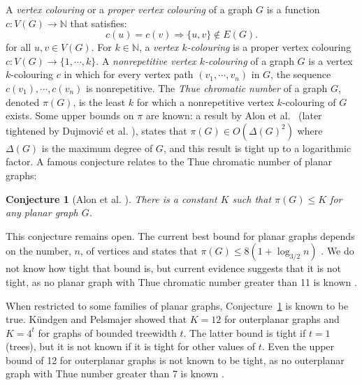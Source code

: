 \documentclass{patmorin}
\newcommand{\naturals}{\mathbb{N}}
\newtheorem{conjecture}[theorem]{Conjecture}
\begin{document}
A \emph{vertex colouring} or a \emph{proper vertex colouring} of a graph $G$ is a function $c: V(G) \rightarrow \naturals$ that satisfies:
\begin{equation}
c(u) = c(v) \Rightarrow \{u,v\} \notin E(G).
\label{eqn:propervcolouring}
\end{equation}
for all $u,v \in V(G)$. For $k \in \naturals$, a \emph{vertex $k$-colouring} is a proper vertex colouring $c : V(G) \rightarrow \{1,\cdots,k\}$.
A \emph{nonrepetitive vertex $k$-colouring} of a graph $G$ is a vertex $k$-colouring $c$ in which for every vertex path $(v_1,\cdots,v_n)$ in $G$, the sequence $c(v_1),\cdots, c(v_n)$ is nonrepetitive. The \emph{Thue chromatic number} of a graph $G$, denoted $\pi(G)$, is the least $k$ for which a nonrepetitive vertex $k$-colouring of $G$ exists. Some upper bounds on $\pi$ are known: a result by Alon et al.~\cite{alon2002nonrepetitive} (later tightened by Dujmovi\'c et al. \cite{dujmovic2011nonrepetitive}), states that $\pi(G) \in O(\Delta(G)^2)$ where $\Delta(G)$ is the maximum degree of $G$, and this result is tight up to a logarithmic factor.  A famous conjecture relates to the Thue chromatic number of planar graphs:
\begin{conjecture}[Alon et al. \cite{alon2002nonrepetitive}]
 There is a constant $K$ such that $\pi(G) \leq K$ for any planar graph $G$.
 \label{conj:planarConstant}
\end{conjecture}
This conjecture remains open. The current best bound for planar graphs depends on the number, $n$, of vertices and states that $\pi(G) \leq 8(1+\log_{3/2}n)$ \cite{dujmovic2012planarlogn}. We do not know how tight that bound is, but current evidence suggests that it is not tight, as no planar graph with Thue chromatic number greater than 11 is known \cite{dujmovic2012planarlogn}. 

When restricted to some families of planar graphs, Conjecture~\ref{conj:planarConstant} is known to be true.  K{\"u}ndgen and Pelsmajer \cite{kundgen2008nonrepetitive} showed that $K=12$ for outerplanar graphs and $K=4^t$ for graphs of bounded treewidth $t$. The latter bound is tight if $t=1$ (trees), but it is not known if it is tight for other values of $t$. Even the upper bound of 12 for outerplanar graphs is not known to be tight, as no outerplanar graph with Thue number greater than 7 is known \cite{barat2007square}.
\end{document}
